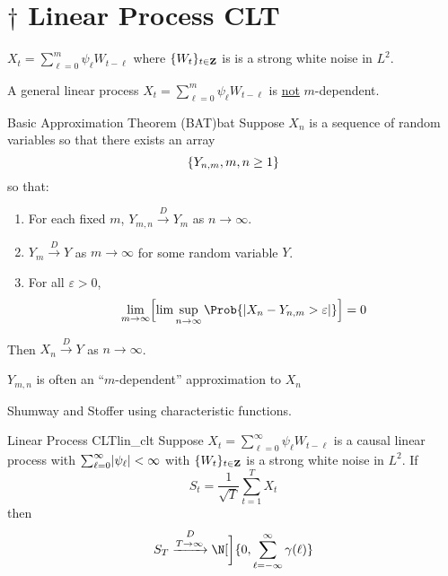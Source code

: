 \section{\texorpdfstring{$ \dagger $}{†} Linear Process CLT}
\begin{Example}{}{}
    $ \displaystyle X_t=\sum_{\ell=0}^{m} \psi_\ell W_{t-\ell} $
    where $ \{W_t\}_{t\in\mathbf{Z}} $ is
    is a strong white noise in $ L^2 $.

    A general linear process $ \displaystyle X_t=\sum_{\ell=0}^{m} \psi_\ell W_{t-\ell} $
    is \underline{not} $ m $-dependent.
\end{Example}
\begin{Theorem}{Basic Approximation Theorem (BAT)}{bat}
    Suppose $ X_n $ is a sequence of random variables
    so that there exists an array
    \[ \{Y_{n,m},m,n\ge 1\} \]
    so that:
    \begin{enumerate}[(1)]
        \item For each fixed $ m $, $ Y_{m,n}\stackrel{D}{\to}Y_m $
              as $ n\to\infty $.
        \item $ Y_m\stackrel{D}{\to} Y $ as $ m\to\infty $ for some random variable $ Y $.
        \item For all $ \varepsilon>0 $,
              \[ \lim\limits_{{m} \to {\infty}}
                  \Bigl[\lim\sup\limits_{{n} \to {\infty}}
                  \Prob{\abs{X_n-Y_{n,m}>\varepsilon}} \Bigr]=0 \]
    \end{enumerate}
    Then $ X_n\stackrel{D}{\to}Y $ as $ n\to\infty $.
\end{Theorem}
\begin{Remark}{}{}
    $ Y_{m,n} $ is often an ``$ m $-dependent'' approximation to $ X_n $
\end{Remark}
\begin{Proof}{}{}
    Shumway and Stoffer using characteristic functions.
\end{Proof}
\begin{Theorem}{Linear Process CLT}{lin_clt}
    Suppose $ X_t=\sum_{\ell=0}^{\infty} \psi_\ell W_{t-\ell} $ is a causal
    linear process with $ \sum_{\ell=0}^{\infty} \lvert\psi_\ell\rvert<\infty $
    with $ \{W_t\}_{t\in\mathbf{Z}} $ is a strong white noise in
    $ L^2 $. If
    \[ S_t=\frac{1}{\sqrt{T}} \sum_{t=1}^{T} X_t \]
    then
    \[ S_T\stackrel{D}{\xrightarrow{T\to\infty}}\N[\bigg]{0,\sum_{\ell=-\infty}^{\infty} \gamma(\ell)} \]
\end{Theorem}
